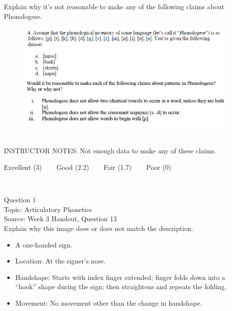 \documentclass[12pt]{article}
\begin{document}
Explain why it's not reasonable to make any of the following claims about Phonologese.\\

\begin{figure}[H]
\includegraphics{../images/Phonologese.png}
\end{figure}

~\\
INSTRUCTOR NOTES: Not enough data to make any of these claims.


\vfill
Excellent (3) ~~~ Good (2.2) ~~~ Fair (1.7) ~~~ Poor (0)
\newpage

\begin{center}
\textbf{{\color{red}{\HUGE END OF EXAM}}}\\

\end{center}
\newpage

\begin{center}
\textbf{{\color{blue}{\HUGE START OF EXAM\\}}}

\textbf{{\color{blue}{\HUGE Student ID: 79667\\}}}

\textbf{{\color{blue}{\HUGE 4:10\\}}}

\end{center}
\newpage

{\large Question 1}\\

Topic: Articulatory Phonetics\\
Source: Week 3 Handout, Question 13\\

Explain why this image does or does not match the description.\\

\begin{itemize} \item A one-handed sign. \item Location: At the signer’s nose. \item Handshape: Starts with index finger extended; finger folds down into a “hook” shape during the sign; then straightens and repeats the folding. \item Movement: No movement other than the change in handshape. \end{itemize}
\end{document}
